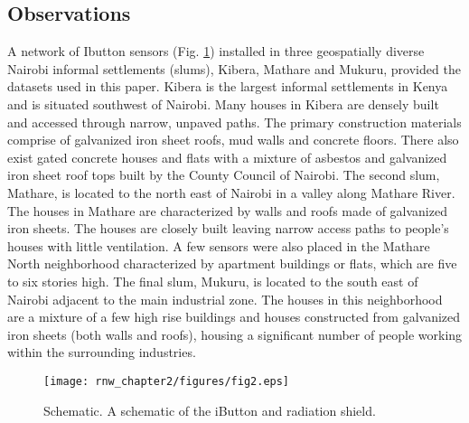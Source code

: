 \subsection{Observations}
A network of Ibutton sensors (Fig. \ref{schematic}) installed in three geospatially diverse Nairobi informal settlements (slums), Kibera, Mathare and Mukuru, provided the datasets used in this paper. Kibera is the largest informal settlements in Kenya and is situated southwest of Nairobi. Many houses in Kibera are densely built and accessed through narrow, unpaved paths. The primary construction materials comprise of galvanized iron sheet roofs, mud walls and concrete floors. There also exist gated concrete houses and flats with a mixture of asbestos and galvanized iron sheet roof tops built by the County Council of Nairobi. The second slum, Mathare, is located to the north east of Nairobi in a valley along Mathare River. The houses in Mathare are characterized by walls and roofs made of galvanized iron sheets. The houses are closely built leaving narrow access paths to people's houses with little ventilation. A few sensors were also placed in the Mathare North neighborhood characterized by apartment buildings or flats, which are five to six stories high. The final slum, Mukuru, is located to the south east of Nairobi adjacent to the main industrial zone. The houses in this neighborhood are a mixture of a few high rise buildings and houses constructed from galvanized iron sheets (both walls and roofs), housing a significant number of people working within the surrounding industries.
\begin{figure}[!h]
\centering
\texttt{[image: rnw\_chapter2/figures/fig2.eps]}
\caption{Schematic. A schematic of the iButton and radiation shield.}
\label{schematic}
\end{figure}

